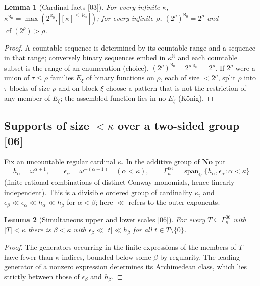 \documentclass[11pt,letterpaper]{article}
\numberwithin{equation}{section}
\newtheorem{lemma}[lemma]{Lemma}
\theoremstyle{definition}
\theoremstyle{remark}
\theoremstyle{plain}
\newcommand{\No}{\mathbf{No}}
\newcommand{\Q}{\mathbb Q}
\newcommand{\N}{\mathbb N}
\newcommand{\cf}{\operatorname{cf}}
\newcommand{\Span}{\operatorname{span}}
\newcommand{\src}[1]{\textup{\textsf{[#1]}}}
\begin{document}
\begin{lemma}[Cardinal facts \src{03}]\label{osq:lem:cardinalfacts}
For every infinite $\kappa$, $\kappa^{\aleph_0}=\max(2^{\aleph_0},|[\kappa]^{\le\aleph_0}|)$; for every
infinite $\rho$, $(2^\rho)^{\aleph_0}=2^\rho$ and $\cf(2^\rho)>\rho$.
\end{lemma}
\begin{proof}
A countable sequence is determined by its countable range and a sequence in that range; conversely
binary sequences embed in $\kappa^\N$ and each countable subset is the range of an enumeration (choice).
$(2^\rho)^{\aleph_0}=2^{\rho\aleph_0}=2^\rho$. If $2^\rho$ were a union of $\tau\le\rho$ families
$E_\xi$ of binary functions on $\rho$, each of size $<2^\rho$, split $\rho$ into $\tau$ blocks of size
$\rho$ and on block $\xi$ choose a pattern that is not the restriction of any member of $E_\xi$; the
assembled function lies in no $E_\xi$ (K\"onig).
\end{proof}

\subsection{Supports of size \texorpdfstring{$<\kappa$}{< kappa} over a two-sided group \texorpdfstring{\src{06}}{[06]}}\label{osq:sub:model06}

Fix an uncountable regular cardinal $\kappa$. In the additive group of $\No$ put
\[
 h_\alpha=\omega^{\alpha+1},\qquad\epsilon_\alpha=\omega^{-(\alpha+1)}\quad(\alpha<\kappa),\qquad
 \Gamma^{06}_\kappa=\Span_\Q\{h_\alpha,\epsilon_\alpha:\alpha<\kappa\}
\]
(finite rational combinations of distinct Conway monomials, hence linearly independent). This is a
divisible ordered group of cardinality $\kappa$, and $\epsilon_\beta\ll\epsilon_\alpha\ll h_\alpha\ll
h_\beta$ for $\alpha<\beta$; here $\ll$ refers to the outer exponents.

\begin{lemma}[Simultaneous upper and lower scales \src{06}]\label{osq:lem:kappagap}
For every $T\subseteq\Gamma^{06}_\kappa$ with $|T|<\kappa$ there is $\beta<\kappa$ with
$\epsilon_\beta\ll|t|\ll h_\beta$ for all $t\in T\setminus\{0\}$.
\end{lemma}
\begin{proof}
The generators occurring in the finite expressions of the members of $T$ have fewer than $\kappa$
indices, bounded below some $\beta$ by regularity. The leading generator of a nonzero expression
determines its Archimedean class, which lies strictly between those of $\epsilon_\beta$ and
$h_\beta$.
\end{proof}
\end{document}
